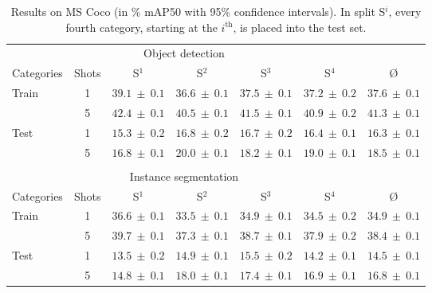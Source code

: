 \documentclass{article}
\newcommand{\plusminus}[1]{{\scriptstyle ~\pm~ #1}}
\begin{document}
\begin{table}[h]
\begin{center}
\begin{small}
\begin{tabular}{lcccccc}
 \multicolumn{6}{c}{Object detection\vspace{4pt}}\\
Categories & Shots & S$^1$ & S$^2$ & S$^3$ & S$^4$ & \O\\
\hline
\multirow{2}{*}{Train} & 1 & $39.1\plusminus{0.1}$ & $36.6\plusminus{0.1}$ & $37.5\plusminus{0.1}$ & $37.2\plusminus{0.2}$ & $37.6\plusminus{0.1}$ \\
 & 5 & $42.4\plusminus{0.1}$ & $40.5\plusminus{0.1}$ & $41.5\plusminus{0.1}$ & $40.9\plusminus{0.2}$ & $41.3\plusminus{0.1}$ \\
\hline
\multirow{2}{*}{Test} & 1 & $15.3\plusminus{0.2}$ & $16.8\plusminus{0.2}$ & $16.7\plusminus{0.2}$ & $16.4\plusminus{0.1}$ & $16.3\plusminus{0.1}$ \\ 
 & 5 & $16.8\plusminus{0.1}$ & $20.0\plusminus{0.1}$ & $18.2\plusminus{0.1}$ & $19.0\plusminus{0.1}$ & $18.5\plusminus{0.1}$ \\
\multicolumn{6}{c}{}\\
 \multicolumn{6}{c}{Instance segmentation\vspace{4pt}} \\
Categories  & Shots & S$^1$ & S$^2$ & S$^3$ & S$^4$ & \O\\
 \hline
\multirow{2}{*}{Train} & 1 & $36.6\plusminus{0.1}$ & $33.5\plusminus{0.1}$ & $34.9\plusminus{0.1}$ & $34.5\plusminus{0.2}$ & $34.9\plusminus{0.1}$ \\
 & 5 & $39.7\plusminus{0.1}$ & $37.3\plusminus{0.1}$ & $38.7\plusminus{0.1}$ & $37.9\plusminus{0.2}$ & $38.4\plusminus{0.1}$ \\
\hline
\multirow{2}{*}{Test} & 1 & $13.5\plusminus{0.2}$ & $14.9\plusminus{0.1}$ & $15.5\plusminus{0.2}$ & $14.2\plusminus{0.1}$ & $14.5\plusminus{0.1}$ \\
 & 5 & $14.8\plusminus{0.1}$ & $18.0\plusminus{0.1}$ & $17.4\plusminus{0.1}$ & $16.9\plusminus{0.1}$ & $16.8\plusminus{0.1}$ \\
\end{tabular}
\end{small}
\end{center}
\caption{Results on MS Coco (in \% mAP50 with 95\% confidence intervals). In split S$^i$, every fourth category, starting at the $i^\mathrm{th}$, is placed into the test set.}
\label{table:results_by_split}
\end{table}
\end{document}

